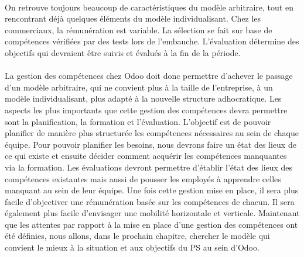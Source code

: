 \paragraph{} On retrouve toujours beaucoup de caractéristiques du modèle arbitraire, tout en rencontrant déjà quelques éléments du modèle individualisant. Chez les commerciaux, la rémunération est variable. La sélection se fait sur base de compétences vérifiées par des tests lors de l'embauche. L'évaluation détermine des objectifs qui devraient être suivis et évalués à la fin de la période.


\paragraph{} La gestion des compétences chez Odoo doit donc permettre d'achever le passage d'un modèle arbitraire, qui ne convient plus à la taille de l'entreprise, à un modèle individualisant, plus adapté à la nouvelle structure adhocratique. Les aspects les plus importants que cette gestion des compétences devra permettre sont la planification, la formation et l'évaluation. L'objectif est de pouvoir planifier de manière plus structurée les compétences nécessaires au sein de chaque équipe. Pour pouvoir planifier les besoins, nous devrons faire un état des lieux de ce qui existe et ensuite décider comment acquérir les compétences manquantes via la formation. Les évaluations devront permettre d'établir l'état des lieux des compétences existantes mais aussi de pousser les employés à apprendre celles manquant au sein de leur équipe. Une fois cette gestion mise en place, il sera plus facile d'objectiver une rémunération basée sur les compétences de chacun. Il sera également plus facile d'envisager une mobilité horizontale et verticale.
Maintenant que les attentes par rapport à la mise en place d'une gestion des compétences ont été définies, nous allons, dans le prochain chapitre, chercher le modèle qui convient le mieux à la situation et aux objectifs du PS au sein d'Odoo.







